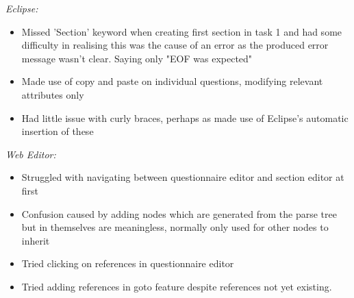 \emph{Eclipse:}
\begin{itemize}
\item Missed 'Section' keyword when creating first section in task 1 and had some difficulty in realising this was the cause of an error as the produced error message wasn't clear. Saying only "EOF was expected"
\item Made use of copy and paste on individual questions, modifying relevant attributes only
\item Had little issue with curly braces, perhaps as made use of Eclipse's automatic insertion of these
\end{itemize}
\emph{Web Editor:}
\begin{itemize}
\item Struggled with navigating between questionnaire editor and section editor at first
\item Confusion caused by adding nodes which are generated from the parse tree but in themselves are meaningless, normally only used for other nodes to inherit
\item Tried clicking on references in questionnaire editor
\item Tried adding references in goto feature despite references not yet existing.
\end{itemize}

